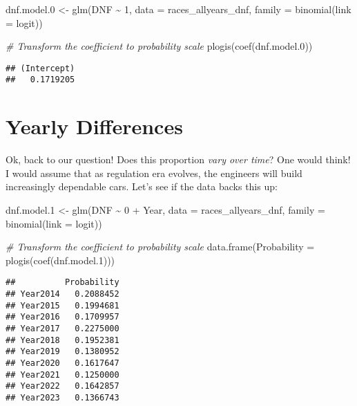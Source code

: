 \documentclass[
]{book}
\newenvironment{Shaded}{\begin{snugshade}}{\end{snugshade}}
\newcommand{\AttributeTok}[1]{\textcolor[rgb]{0.77,0.63,0.00}{#1}}
\newcommand{\CommentTok}[1]{\textcolor[rgb]{0.56,0.35,0.01}{\textit{#1}}}
\newcommand{\DecValTok}[1]{\textcolor[rgb]{0.00,0.00,0.81}{#1}}
\newcommand{\FloatTok}[1]{\textcolor[rgb]{0.00,0.00,0.81}{#1}}
\newcommand{\FunctionTok}[1]{\textcolor[rgb]{0.00,0.00,0.00}{#1}}
\newcommand{\NormalTok}[1]{#1}
\newcommand{\OtherTok}[1]{\textcolor[rgb]{0.56,0.35,0.01}{#1}}
\newcommand{\SpecialCharTok}[1]{\textcolor[rgb]{0.00,0.00,0.00}{#1}}
\newcommand{\StringTok}[1]{\textcolor[rgb]{0.31,0.60,0.02}{#1}}
\begin{document}
\begin{Shaded}
\begin{Highlighting}[]
\NormalTok{dnf.model}\FloatTok{.0} \OtherTok{\textless{}{-}} \FunctionTok{glm}\NormalTok{(DNF }\SpecialCharTok{\textasciitilde{}} \DecValTok{1}\NormalTok{, }\AttributeTok{data =}\NormalTok{ races\_allyears\_dnf,}
                   \AttributeTok{family =} \FunctionTok{binomial}\NormalTok{(}\AttributeTok{link =} \StringTok{\textquotesingle{}logit\textquotesingle{}}\NormalTok{))}

\CommentTok{\# Transform the coefficient to probability scale}
\FunctionTok{plogis}\NormalTok{(}\FunctionTok{coef}\NormalTok{(dnf.model}\FloatTok{.0}\NormalTok{))}
\end{Highlighting}
\end{Shaded}

\begin{verbatim}
## (Intercept) 
##   0.1719205
\end{verbatim}

\hypertarget{yearly-differences}{%
\section{Yearly Differences}\label{yearly-differences}}

Ok, back to our question! Does this proportion \emph{vary over time}? One would think! I would assume that as regulation era evolves, the engineers will build increasingly dependable cars. Let's see if the data backs this up:

\begin{Shaded}
\begin{Highlighting}[]
\NormalTok{dnf.model}\FloatTok{.1} \OtherTok{\textless{}{-}} \FunctionTok{glm}\NormalTok{(DNF }\SpecialCharTok{\textasciitilde{}} \DecValTok{0} \SpecialCharTok{+}\NormalTok{ Year, }\AttributeTok{data =}\NormalTok{ races\_allyears\_dnf,}
                   \AttributeTok{family =} \FunctionTok{binomial}\NormalTok{(}\AttributeTok{link =} \StringTok{\textquotesingle{}logit\textquotesingle{}}\NormalTok{))}

\CommentTok{\# Transform the coefficient to probability scale}
\FunctionTok{data.frame}\NormalTok{(}\AttributeTok{Probability =} \FunctionTok{plogis}\NormalTok{(}\FunctionTok{coef}\NormalTok{(dnf.model}\FloatTok{.1}\NormalTok{)))}
\end{Highlighting}
\end{Shaded}

\begin{verbatim}
##          Probability
## Year2014   0.2088452
## Year2015   0.1994681
## Year2016   0.1709957
## Year2017   0.2275000
## Year2018   0.1952381
## Year2019   0.1380952
## Year2020   0.1617647
## Year2021   0.1250000
## Year2022   0.1642857
## Year2023   0.1366743
\end{verbatim}
\end{document}
